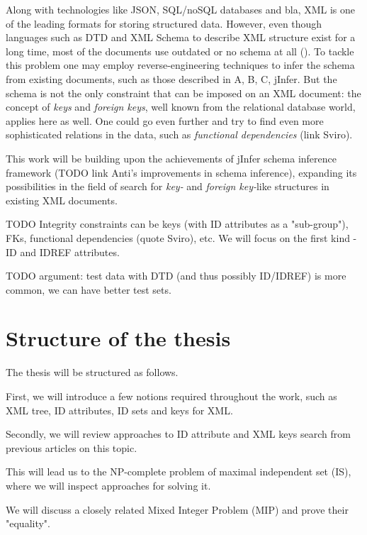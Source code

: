 \label{chapter-preface}

Along with technologies like JSON, SQL/noSQL databases and bla, XML is one of the leading formats for storing structured data. However, even though languages such as DTD and XML Schema to describe XML structure exist for a long time, most of the documents use outdated or no schema at all (\cite{1802522}). To tackle this problem one may employ reverse-engineering techniques to infer the schema from existing documents, such as those described in A, B, C, jInfer. But the schema is not the only constraint that can be imposed on an XML document: the concept of \textit{keys} and \textit{foreign keys}, well known from the relational database world, applies here as well. One could go even further and try to find even more sophisticated relations in the data, such as \textit{functional dependencies} (link Sviro).

This work will be building upon the achievements of jInfer schema inference framework (TODO link Anti's improvements in schema inference), expanding its possibilities in the field of search for \textit{key-} and \textit{foreign key-}like structures in existing XML documents.

TODO Integrity constraints can be keys (with ID attributes as a "sub-group"), FKs, functional dependencies (quote Sviro), etc.
We will focus on the first kind - ID and IDREF attributes.

TODO argument: test data with DTD (and thus possibly ID/IDREF) is more common, we can have better test sets.

\section{Structure of the thesis}

The thesis will be structured as follows. 

First, we will introduce a few notions required throughout the work, such as XML tree, ID attributes, ID sets and keys for XML. 

Secondly, we will review approaches to ID attribute and XML keys search from previous articles on this topic. 

This will lead us to the NP-complete problem of maximal independent set (IS), where we will inspect approaches for solving it.

We will discuss a closely related Mixed Integer Problem (MIP) and prove their "equality".

